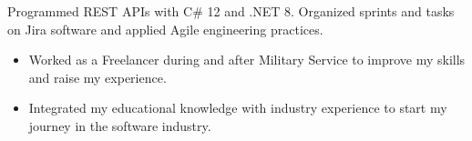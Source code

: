 





Programmed REST APIs with C\# 12 and .NET 8. Organized sprints and tasks on Jira software and applied Agile engineering practices.

\divider

\begin{itemize}
    \item Worked as a Freelancer during and after Military Service to improve my skills and raise my experience.
    \item Integrated my educational knowledge with industry experience to start my journey in the software industry.
\end{itemize}